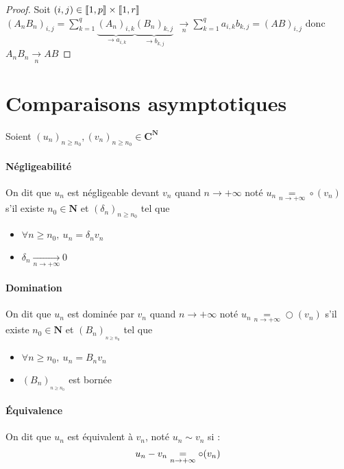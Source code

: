 		\begin{proof}
			Soit $(i,j)\in{\llbracket 1,p \rrbracket}\times{\llbracket 1,r \rrbracket}$ \\ 
			$\left(A_nB_n\right) _{i,j} = \sum_{k=1}^{q} \underbrace{\left(A_n\right)_{i,k}}_{\rightarrow a_{i,k}}
			\underbrace{\left(B_n\right)_{k,j}}_{\rightarrow b_{k,j}}$ $\underset{n}{\rightarrow} \sum_{k=1}^{q} a_{i,k}b_{k,j} = (AB)_{i,j}$ donc 
			$A_nB_n \underset{n}{\rightarrow} AB$
		\end{proof}


\section{Comparaisons asymptotiques}
	
		Soient $\left(u_n\right)_{n\geq n_0} ,\left(v_n\right)_{n\geq n_0} \in \mathbf{C}^{\mathbf{N}}$ 
		
		\traitd
		\paragraph{Négligeabilité}
			On dit que $u_n$ est négligeable devant $v_n$ quand $n\rightarrow +\infty$ noté $u_n \underset{n\rightarrow +\infty}{=} \circ (v_n)$ s'il existe $n_0 \in \mathbf{N}$ et $\left(\delta_n\right)_{n\geq n_0}$ tel que
			\begin{itemize}
				\item $\forall n\geq n_0 ,~u_n = \delta_nv_n$
				\item $\delta_n \underset{n\rightarrow +\infty}{\longrightarrow} 0$
			\end{itemize}
		\traitdouble
		\paragraph{Domination}
			On dit que $u_n$ est dominée par $v_n$ quand $n\rightarrow +\infty$ noté $u_n \underset{n\rightarrow +\infty}{=} \bigcirc (v_n)$ s'il existe $n_0 \in \mathbf{N}$ et $\left(B_n\right)_{_{n\geq n_0}}$ tel que
			\begin{itemize}
				\item $\forall n\geq n_0 ,~u_n = B_nv_n$ 
				\item $\left( B_n \right)_{_{n\geq n_0}}$ est bornée
			\end{itemize}
		\trait

		\newpage

		\traitd
		\paragraph{Équivalence}
			On dit que $u_n$ est équivalent à $v_n$, noté $u_n \sim v_n$ 
			si : 
			\[
				u_n - v_n \underset{n\rightarrow +\infty}{=} \circ (v_n) 
			\vspace*{-25pt}
			\]
		\trait

